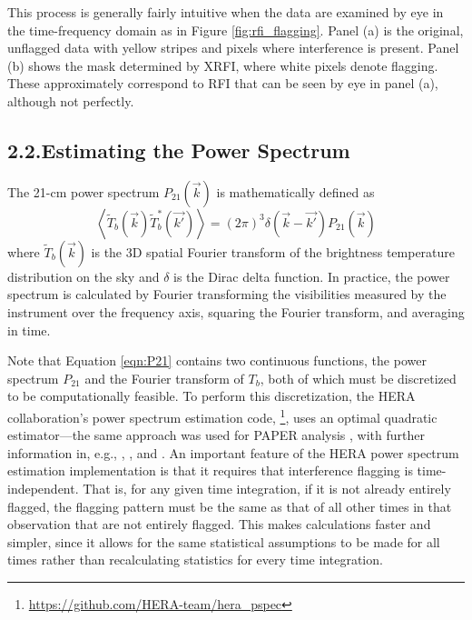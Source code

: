 \documentclass[12pt]{article}
\begin{document}
This process is generally fairly intuitive when the data are examined by eye in the time-frequency domain as in Figure \ref{fig:rfi_flagging}. Panel (a) is the original, unflagged data with yellow stripes and pixels where interference is present. Panel (b) shows the mask determined by XRFI, where white pixels denote flagging. These approximately correspond to RFI that can be seen by eye in panel (a), although not perfectly. \vspace{3mm}

\tocless\subsection{\hypertarget{subsec:pspecestimation}{2.2.\hspace{0.75em}Estimating the Power Spectrum}}

The 21-cm power spectrum $P_{21}\left(\vec{k}\right)$ is mathematically defined as
\begin{equation}
\left\langle \widetilde{T}_b\left(\vec{k}\right) \widetilde{T}_b^*\left(\vec{k'}\right) \right\rangle = \left(2\pi\right)^3 \delta\left(\vec{k} - \vec{k'}\right) P_{21}\left(\vec{k}\right)
\label{eqn:P21}
\end{equation}
where $\widetilde{T}_b\left(\vec{k}\right)$ is the 3D spatial Fourier transform of the brightness temperature distribution on the sky and $\delta$ is the Dirac delta function. In practice, the power spectrum is calculated by Fourier transforming the visibilities measured by the instrument over the frequency axis, squaring the Fourier transform, and averaging in time.

Note that Equation \ref{eqn:P21} contains two continuous functions, the power spectrum $P_{21}$ and the Fourier transform of $T_b$, both of which must be discretized to be computationally feasible. To perform this discretization, the HERA collaboration's power spectrum estimation code, \herapspec\footnote{\url{https://github.com/HERA-team/hera_pspec}}, uses an optimal quadratic estimator---the same approach was used for PAPER analysis \citep{ali2015}, with further information in, e.g., \cite{tegmark1997}, \cite{tegmark1998}, and \cite{liu2011}. An important feature of the HERA power spectrum estimation implementation is that it requires that interference flagging is time-independent. That is, for any given time integration, if it is not already entirely flagged, the flagging pattern must be the same as that of all other times in that observation that are not entirely flagged. This makes calculations faster and simpler, since it allows for the same statistical assumptions to be made for all times rather than recalculating statistics for every time integration.
\end{document}
